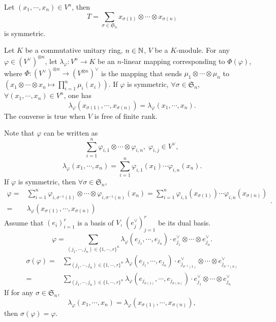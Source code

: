 \begin{exampleenv}
    Let $(x_1,\cdots,x_n) \in V^n$, then
    $$T = \sum_{\sigma \in \mathfrak{S}_n} x_{\sigma(1)} \otimes \cdots \otimes x_{\sigma(n)}$$
    is symmetric.
\end{exampleenv}

\begin{propositionenv}
    Let $K$ be a commutative unitary ring, $n \in \mathbb{N}$, $V$ be a $K$-module.
    For any $\varphi \in (V^\vee)^{\otimes n}$,
    let $\lambda_\varphi : V^n \rightarrow K$ be an $n$-linear mapping corresponding to $\Phi(\varphi)$,
    where $\Phi : (V^\vee)^{\otimes n} \rightarrow (V^{\otimes n})^\vee$ is the mapping that sends $\mu_1 \otimes \cdots \otimes \mu_n$ to $(x_1 \otimes \cdots \otimes x_n \mapsto \prod_{i=1}^{n}\mu_{i}(x_i))$.
    If $\varphi$ is symmetric, $\forall \sigma \in \mathfrak{S}_{n}$, $\forall (x_1,\cdots,x_n) \in V^n$, one has
    $$\lambda_\varphi (x_{\sigma(1)},\cdots,x_{\sigma(n)}) = \lambda_\varphi(x_1,\cdots,x_n).$$
    The converse is true when $V$ is free of finite rank.
\end{propositionenv}
\begin{proofenv}
    Note that $\varphi$ can be written as
    $$\sum_{i=1}^{n} \varphi_{i,1} \otimes \cdots \otimes \varphi_{i,n},\; \varphi_{i,j} \in V^\vee,$$
    $$\lambda_{\varphi}(x_1,\cdots,x_n) = \sum_{i=1}^{n} \varphi_{i,1}(x_1)\cdots \varphi_{i,n}(x_n).$$
    If $\varphi$ is symmetric, then $\forall \sigma \in \mathfrak{S}_n$,
    $$\begin{aligned}
        \varphi = & \sum_{i=1}^{n}\varphi_{i,\sigma^{-1}(1)} \otimes \cdots \otimes \varphi_{i,\sigma^{-1}(n)}(x_n) = \sum_{i=1}^{n}\varphi_{i,1}(x_{\sigma(1)}) \cdots \varphi_{i,n}(x_{\sigma(n)})\\
        = & \lambda_{\varphi}(x_{\sigma(1)},\cdots,x_{\sigma(n)})
    \end{aligned}.$$
    Assume that $(e_i)_{i=1}^r$ is a basis of $V$, $(e_j^\vee)_{j=1}^r$ be its dual basis.
    $$\varphi = \sum_{(j_1,\cdots,j_n) \in \{1,\cdots,r\}^n} \lambda_{\varphi} (e_{j_1},\cdots,e_{j_n})\cdot e_{j_1}^\vee \otimes \cdots \otimes e_{j_n}^\vee.$$
    $$\begin{aligned}
        \sigma(\varphi) = & \sum_{(j_1,\cdots,j_n) \in \{1,\cdots,r\}^n} \lambda_{\varphi} (e_{j_1},\cdots,e_{j_n})\cdot e_{j_{\sigma^{-1}(1)}}^\vee \otimes \cdots \otimes e_{j_{\sigma^{-1}(n)}}^\vee\\
        = & \sum_{(j_1,\cdots,j_n) \in \{1,\cdots,r\}^n} \lambda_{\varphi} (e_{j_{\sigma(1)}},\cdots,e_{j_{\sigma(n)}})\cdot e_{j_1}^\vee \otimes \cdots \otimes e_{j_n}^\vee
    \end{aligned}$$
    If for any $\sigma \in \mathfrak{S}_n$,
    $$\lambda_{\varphi}(x_1,\cdots,x_n) = \lambda_{\varphi}(x_{\sigma(1)},\cdots,x_{\sigma(n)}),$$
    then $\sigma(\varphi) = \varphi$.
\end{proofenv}

